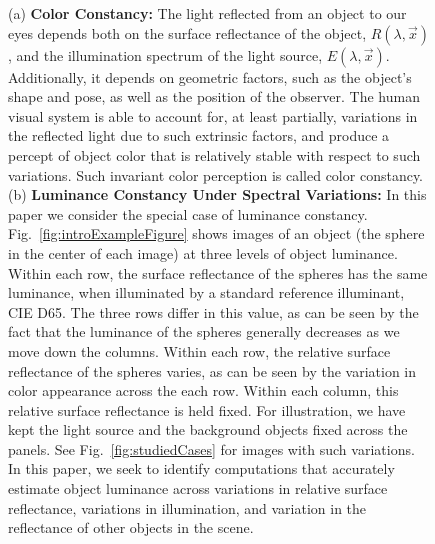 \documentclass{jov}
\begin{document}
\begin{figure}
    \caption{(a) {\bf Color Constancy:} The light reflected from an object to our eyes depends both on the surface reflectance of the object, $R(\lambda,\vec{x})$, and the illumination spectrum of the light source, $E(\lambda,\vec{x})$. Additionally, it depends on geometric factors, such as the object's shape and pose, as well as the position of the observer. The human visual system is able to account for, at least partially, variations in the reflected light due to such extrinsic factors, and produce a percept of object color that is relatively stable with respect to such variations. Such invariant color perception is called color constancy. (b) {\bf Luminance Constancy Under Spectral Variations:} In this paper we consider the special case of luminance constancy. Fig.~\ref{fig:introExampleFigure} shows images of an object (the sphere in the center of each image) at three levels of object luminance. Within each row, the surface reflectance of the spheres has the same luminance, when illuminated by a standard reference illuminant, CIE D65. The three rows differ in this value, as can be seen by the fact that the luminance of the spheres generally decreases as we move down the columns. Within each row, the relative surface reflectance of the spheres varies, as can be seen by the variation in color appearance across the each row.  Within each column, this relative surface reflectance is held fixed. For illustration, we have kept the light source and the background objects fixed across the panels. See Fig.~\ref{fig:studiedCases} for images with such variations. In this paper, we seek to identify computations that accurately estimate object luminance across variations in relative surface reflectance, variations in illumination, and variation in the reflectance of other objects in the scene.}
 \end{figure}
\end{document}

